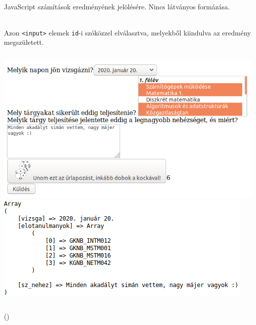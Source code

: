 \begin{frame}
  \begin{description}[m]
    \item[\texttt{<output>}] \hfill \\ JavaScript számítások 
    eredményének jelölésére. Nincs látványos formázása.
    \begin{description}[m]
      \item[\texttt{for}] \hfill \\ Azon \texttt{<input>} elemek 
      \texttt{id}-i szóközzel elválasztva, melyekből kiindulva az eredmény 
      megszületett.
    \end{description}
  \end{description}
  \begin{columns}[T]
      \includegraphics[width=\textwidth]{urlap7-1.png}
      \includegraphics[width=\textwidth]{urlap7-2.png}
  \end{columns}
\end{frame}

\begin{frame}
  \begin{exampleblock}{ 
  ()}
    \footnotesize
    
  \end{exampleblock}
\end{frame}

